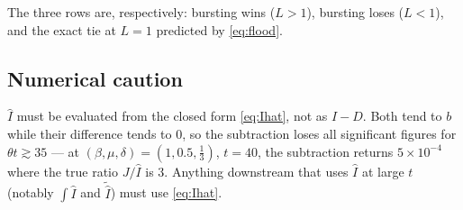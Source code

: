 \documentclass[11pt]{article}
\newcommand{\Ihat}{\widehat{I}}
\newcommand{\Lap}[1]{\widetilde{#1}}
\theoremstyle{plain}
\theoremstyle{definition}
\theoremstyle{remark}
\begin{document}
The three rows are, respectively: bursting wins ($L>1$), bursting loses ($L<1$), and the
exact tie at $L=1$ predicted by \eqref{eq:flood}.

\subsection*{Numerical caution}

$\Ihat$ must be evaluated from the closed form \eqref{eq:Ihat}, not as $I-D$. Both tend
to $b$ while their difference tends to $0$, so the subtraction loses all significant
figures for $\theta t\gtrsim35$ --- at $(\beta,\mu,\delta)=(1,0.5,\tfrac13)$, $t=40$, the
subtraction returns $5\times10^{-4}$ where the true ratio $J/\Ihat$ is $3$. Anything
downstream that uses $\Ihat$ at large $t$ (notably $\int\Ihat$ and $\Lap{\Ihat}$) must use
\eqref{eq:Ihat}.
\end{document}
